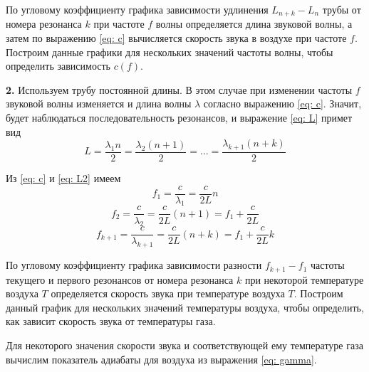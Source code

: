 По угловому коэффициенту графика зависимости удлинения $L_{n+k} - L_n$ трубы от номера резонанса $k$ при частоте $f$ волны определяется длина звуковой волны, а затем по выражению \eqref{eq: c} вычисляется скорость звука в воздухе при частоте $f$. Построим данные графики для нескольких значений частоты волны, чтобы определить зависимость $c(f)$.

\textbf{2.} Используем трубу постоянной длины. В этом случае при изменении частоты $f$ звуковой волны изменяется и длина волны $\lambda$ согласно выражению \eqref{eq: c}. Значит, будет наблюдаться последовательность резонансов, и выражение \eqref{eq: L} примет вид
\begin{equation}
    L = \frac{\lambda_1 n}{2} = \frac{\lambda_2 (n+1)}{2} = \dots = \frac{\lambda_{k+1} (n+k)}{2} \label{eq: L2}
\end{equation}

Из \eqref{eq: c} и \eqref{eq: L2} имеем
\[f_1 = \frac{c}{\lambda_1} = \frac{c}{2L}n\]
\[f_2 = \frac{c}{\lambda_2} = \frac{c}{2L}(n+1) = f_1 + \frac{c}{2L}\]
\begin{equation}
    f_{k+1} = \frac{c}{\lambda_{k+1}} = \frac{c}{2L}(n+k) = f_1 + \frac{c}{2L}k \label{eq: fk}
\end{equation}

По угловому коэффициенту графика зависимости разности $f_{k+1} - f_1$ частоты текущего и первого резонансов от номера резонанса $k$ при некоторой температуре воздуха $T$ определяется скорость звука при температуре воздуха $T$. Построим данный график для нескольких значений температуры воздуха, чтобы определить, как зависит скорость звука от температуры газа.

Для некоторого значения скорости звука и соответствующей ему температуре газа вычислим показатель адиабаты для воздуха из выражения \eqref{eq: gamma}.